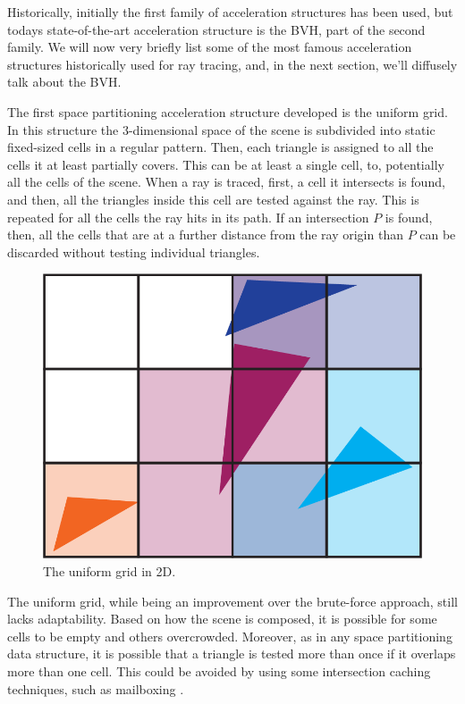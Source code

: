 \documentclass{PoliMi_MasterThesis}
\begin{document}
Historically, initially the first family of acceleration structures has been used, but todays state-of-the-art acceleration structure is the BVH, part of the second family. We will now very briefly list some of the most famous acceleration structures historically used for ray tracing, and, in the next section, we'll diffusely talk about the BVH.

The first space partitioning acceleration structure developed is the uniform grid. In this structure the 3-dimensional space of the scene is subdivided into static fixed-sized cells in a regular pattern. Then, each triangle is assigned to all the cells it at least partially covers. This can be at least a single cell, to, potentially all the cells of the scene. When a ray is traced, first, a cell it intersects is found, and then, all the triangles inside this cell are tested against the ray. This is repeated for all the cells the ray hits in its path. If an intersection $P$ is found, then, all the cells that are at a further distance from the ray origin than $P$ can be discarded without testing individual triangles.

\begin{figure}[H]
    \centering
    \includegraphics[width=\textwidth*\real{0.45}]{Images/uniform_grid.png}
    \caption{The uniform grid in 2D.}
    \label{fig:uniform_grid}
\end{figure}

The uniform grid, while being an improvement over the brute-force approach, still lacks adaptability. Based on how the scene is composed, it is possible for some cells to be empty and others overcrowded. Moreover, as in any space partitioning data structure, it is possible that a triangle is tested more than once if it overlaps more than one cell. This could be avoided by using some intersection caching techniques, such as mailboxing \cite{mailboxing}.
\end{document}
